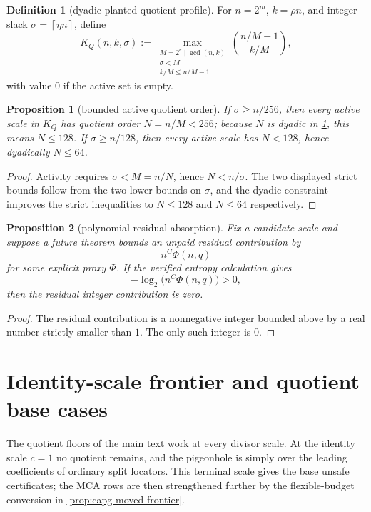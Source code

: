\documentclass[11pt]{article}
\newtheorem{proposition}[proposition]{Proposition}
\theoremstyle{definition}
\newtheorem{definition}[definition]{Definition}
\theoremstyle{remark}
\providecommand{\ceil}[1]{\left\lceil #1\right\rceil}
\begin{document}
\begin{definition}[dyadic planted quotient profile]\label{def:capf-qprofile}
For $n=2^m$, $k=\rho n$, and integer slack $\sigma=\ceil{\eta n}$, define
\[
K_Q(n,k,\sigma):=
\max_{\substack{M=2^e\mid\gcd(n,k)\\ \sigma<M\\ k/M\le n/M-1}}
\binom{n/M-1}{k/M},
\]
with value $0$ if the active set is empty.
\end{definition}

\begin{proposition}[bounded active quotient order]\label{prop:capf-qprofile}
If $\sigma\ge n/256$, then every active scale in $K_Q$ has quotient order $N=n/M<256$; because $N$ is dyadic in \cref{def:capf-qprofile}, this means $N\le128$.  If $\sigma\ge n/128$, then every active scale has $N<128$, hence dyadically $N\le64$.
\end{proposition}

\begin{proof}
Activity requires $\sigma<M=n/N$, hence $N<n/\sigma$.  The two displayed strict bounds follow from the two lower bounds on $\sigma$, and the dyadic constraint improves the strict inequalities to $N\le128$ and $N\le64$ respectively.
\end{proof}

\begin{proposition}[polynomial residual absorption]\label{prop:capf-integrality}
Fix a candidate scale and suppose a future theorem bounds an unpaid residual contribution by
\[
        n^C\Phi(n,q)
\]
for some explicit proxy $\Phi$.  If the verified entropy calculation gives
\[
        -\log_2\bigl(n^C\Phi(n,q)\bigr)>0,
\]
then the residual integer contribution is zero.
\end{proposition}

\begin{proof}
The residual contribution is a nonnegative integer bounded above by a real number strictly smaller than $1$.  The only such integer is $0$.
\end{proof}

\section{Identity-scale frontier and quotient base cases}\label{sec:capff1-frontier}

The quotient floors of the main text work at every divisor scale.  At the identity scale $c=1$ no quotient remains, and the pigeonhole is simply over the leading coefficients of ordinary split locators.  This terminal scale gives the base unsafe certificates; the MCA rows are then strengthened further by the flexible-budget conversion in \cref{prop:capg-moved-frontier}.
\end{document}
